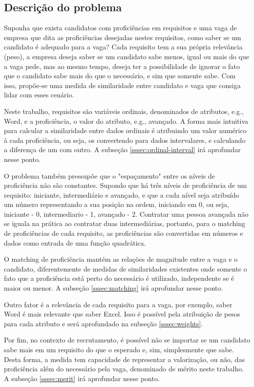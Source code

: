 \documentclass[preprint,12pt]{elsarticle}
\begin{document}
\subsection{Descrição do problema}

Suponha que exista candidatos com proficiências em requisitos e uma vaga de empresa que dita as proficiências desejadas nestes requisitos, como saber se um candidato é adequado para a vaga? Cada requisito tem a sua própria relevância (peso), a empresa deseja saber se um candidato sabe menos, igual ou mais do que a vaga pede, mas ao mesmo tempo, deseja ter a possibilidade de ignorar o fato que o candidato sabe mais do que o necessário, e sim que somente sabe. Com isso, propõe-se uma medida de similaridade entre candidato e vaga que consiga lidar com esses cenário.

Neste trabalho, requisitos são variáveis ordinais, denominados de atributos, e.g., Word, e a proficiência, o valor do atributo, e.g., avançado. A forma mais intuitiva para calcular a similaridade entre dados ordinais é atribuindo um valor numérico à cada proficiência, ou seja, os convertendo para dados intervalares, e calculando a diferença de um com outro. A subseção \ref{sssec:ordinal-interval} irá aprofundar nesse ponto.

O problema também pressupõe que o "espaçamento" entre os níveis de proficiência não são constantes. Supondo que há três níveis de proficiência de um requisito: iniciante, intermediário e avançado, e que a cada nível seja atribuído um número representando a sua posição na ordem, iniciando em 0, ou seja, iniciante - 0, intermediario - 1, avançado - 2. Contratar uma pessoa avançada não se iguala na prática ao contratar duas intermediárias, portanto, para o matching de proficiências de cada requisito, as proficiências são convertidas em números e dados como entrada de uma função quadrática. 

O matching de proficiência mantém as relações de magnitude entre a vaga e o candidato, diferentemente de medidas de similaridades existentes onde somente o fato que a proficiência está perto do necessário é utilizado, independente se é maior ou menor. A subseção \ref{sssec:matching} irá aprofundar nesse ponto.

Outro fator é a relevância de cada requisito para a vaga, por exemplo, saber Word é mais relevante que saber Excel. Isso é possível pela atribuição de pesos para cada atributo e será aprofundado na subseção \ref{sssec:weights}.

Por fim, no contexto de recrutamento, é possível não se importar se um candidato sabe mais em um requisito do que o esperado e, sim, simplesmente que sabe. Desta forma, a medida tem capacidade de representar a valorização, ou não, das proficiência além do necessário pela vaga, denominado de mérito neste trabalho. A subseção \ref{sssec:merit} irá aprofundar nesse ponto.
\end{document}
